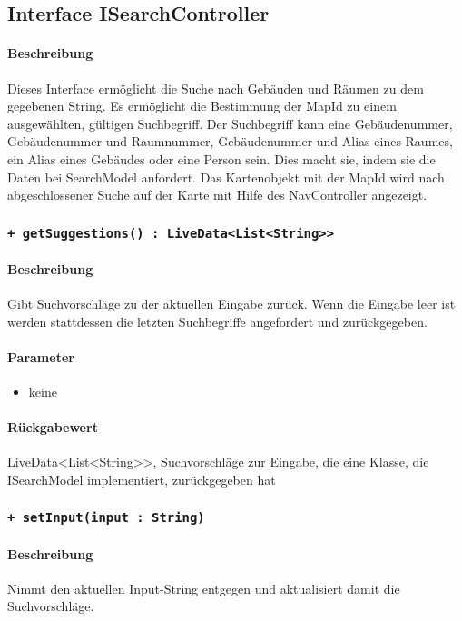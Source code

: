\subsection{Interface ISearchController}
\paragraph*{Beschreibung}
Dieses Interface ermöglicht die Suche nach Gebäuden und Räumen zu dem gegebenen String. 
Es ermöglicht die Bestimmung der MapId zu einem ausgewählten, gültigen Suchbegriff. 
Der Suchbegriff kann eine Gebäudenummer, Gebäudenummer und Raumnummer, Gebäudenummer und Alias eines Raumes, ein Alias eines Gebäudes oder eine Person sein.
Dies macht sie, indem sie die Daten bei SearchModel anfordert.
Das Kartenobjekt mit der MapId wird nach abgeschlossener Suche auf der Karte mit Hilfe des NavController angezeigt.


\subsubsection{\texttt{+ getSuggestions() : LiveData<List<String>>}}%
\paragraph*{Beschreibung}
Gibt Suchvorschläge zu der aktuellen Eingabe zurück.
Wenn die Eingabe leer ist werden stattdessen die letzten Suchbegriffe angefordert und zurückgegeben.
\paragraph*{Parameter}
\begin{itemize}
    \item keine
\end{itemize}
\paragraph*{Rückgabewert}
LiveData<List<String>>, Suchvorschläge zur Eingabe, die eine Klasse, die ISearchModel implementiert, zurückgegeben hat

\subsubsection{\texttt{+ setInput(input : String)}}%
\paragraph*{Beschreibung}
Nimmt den aktuellen Input-String entgegen und aktualisiert damit die Suchvorschläge.
